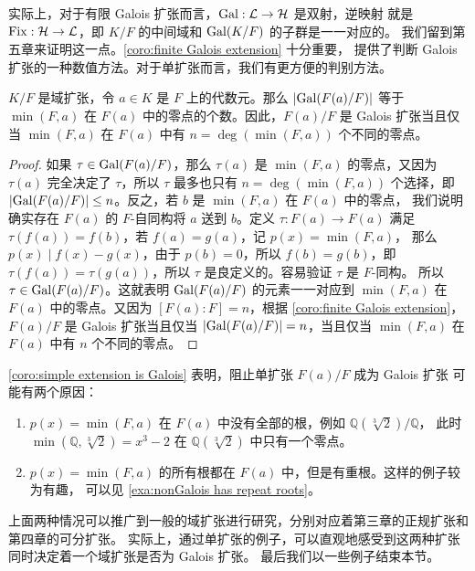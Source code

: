实际上，对于有限 Galois 扩张而言，$\operatorname{Gal}:\mathcal{L}\to\mathcal{H}$ 是双射，逆映射
就是 $\operatorname{Fix}:\mathcal{H}\to\mathcal{L}$，即 $K/F$ 的中间域和 $\operatorname{Gal}(K/F)$ 的子群是一一对应的。
我们留到第五章来证明这一点。\autoref{coro:finite Galois extension} 十分重要，
提供了判断 Galois 扩张的一种数值方法。对于单扩张而言，我们有更方便的判别方法。

\begin{corollary}\label{coro:simple extension is Galois}
  $K/F$ 是域扩张，令 $a\in K$ 是 $F$ 上的代数元。那么 $\lvert\operatorname{Gal}(F(a)/F)\rvert$
  等于 $\min (F,a)$ 在 $F(a)$ 中的零点的个数。因此，$F(a)/F$ 是 Galois 扩张当且仅当
  $\min(F,a)$ 在 $F(a)$ 中有 $n=\deg(\min(F,a))$ 个不同的零点。
\end{corollary}
\begin{proof}
  如果 $\tau\in\operatorname{Gal}(F(a)/F)$，那么 $\tau(a)$ 是 $\min(F,a)$ 的零点，又因为 $\tau(a)$
  完全决定了 $\tau$，所以 $\tau$ 最多也只有 $n=\deg(\min(F,a))$ 个选择，即
  $\lvert\operatorname{Gal}(F(a)/F)\rvert\leq n$。反之，若 $b$ 是 $\min(F,a)$ 在 $F(a)$ 中的零点，
  我们说明确实存在 $F(a)$ 的 $F$-自同构将 $a$ 送到 $b$。定义
  $\tau:F(a)\to F(a)$ 满足 $\tau(f(a))=f(b)$，若 $f(a)=g(a)$，记 $p(x)=\min (F,a)$，
  那么 $p(x)\mid f(x)-g(x)$，由于 $p(b)=0$，所以 $f(b)=g(b)$，即
  $\tau(f(a))=\tau(g(a))$，所以 $\tau$ 是良定义的。容易验证 $\tau$ 是 $F$-同构。
  所以 $\tau\in\operatorname{Gal}(F(a)/F)$。这就表明 $\operatorname{Gal}(F(a)/F)$ 的元素一一对应到
  $\min (F,a)$ 在 $F(a)$ 中的零点。又因为 $[F(a):F]=n$，根据 \autoref{coro:finite Galois extension}，
  $F(a)/F$ 是 Galois 扩张当且仅当 $\lvert\operatorname{Gal}(F(a)/F)\rvert=n$，当且仅当
  $\min (F,a)$ 在 $F(a)$ 中有 $n$ 个不同的零点。
\end{proof}

\autoref{coro:simple extension is Galois} 表明，阻止单扩张 $F(a)/F$ 成为 Galois 扩张
可能有两个原因：
\begin{enumerate}
  \item $p(x)=\min(F,a)$ 在 $F(a)$ 中没有全部的根，例如 $\mathbb{Q}(\sqrt[3]{2})/\mathbb{Q}$，
  此时 $\min(\mathbb{Q},\sqrt[3]{2})=x^3-2$ 在 $\mathbb{Q}(\sqrt[3]{2})$ 中只有一个零点。
  \item $p(x)=\min(F,a)$ 的所有根都在 $F(a)$ 中，但是有重根。这样的例子较为有趣，
  可以见 \autoref{exa:nonGalois has repeat roots}。
\end{enumerate}
上面两种情况可以推广到一般的域扩张进行研究，分别对应着第三章的正规扩张和第四章的可分扩张。
实际上，通过单扩张的例子，可以直观地感受到这两种扩张同时决定着一个域扩张是否为 Galois 扩张。
最后我们以一些例子结束本节。

